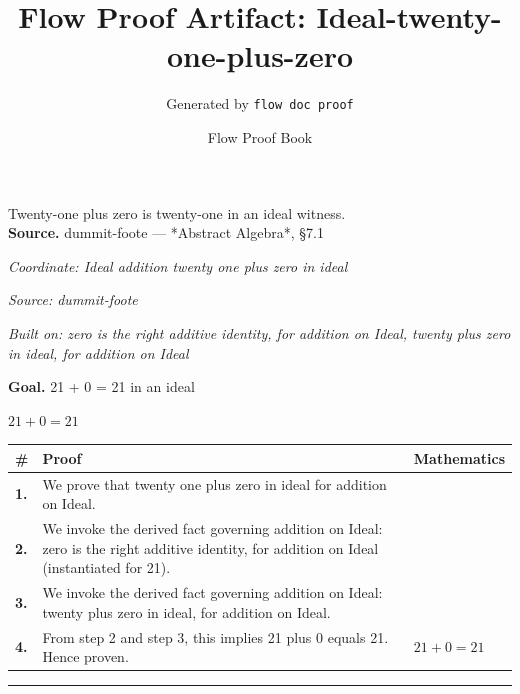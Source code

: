 \documentclass[11pt]{article}
\title{Flow Proof Artifact: Ideal-twenty-one-plus-zero}
\author{Generated by \texttt{flow doc proof}}
\date{Flow Proof Book}
\theoremstyle{definition}
\begin{document}
\maketitle
Twenty-one plus zero is twenty-one in an ideal witness.\\[0.5em]
\textbf{Source.} dummit-foote — *Abstract Algebra*, §7.1\\[0.5em]
\bigskip
{}\par
\smallskip\noindent\textit{Coordinate: Ideal \cdot addition \cdot twenty one plus zero in ideal}\par
\smallskip\noindent\textit{Source: dummit-foote}\par
\smallskip\noindent\textit{Built on: zero is the right additive identity, for addition on Ideal, twenty plus zero in ideal, for addition on Ideal}\par
\medskip
\noindent\textbf{Goal.} 21 + 0 = 21 in an ideal\par
\noindent$\displaystyle 21 + 0 = 21$\par
\medskip
\noindent
\begin{tabular}{@{} >{\raggedright\arraybackslash}p{} >{\raggedright\arraybackslash}p{} >{\raggedleft\arraybackslash}p{} @{}}
\textbf{\#} & \textbf{Proof} & \textbf{Mathematics} \\
\midrule
\textbf{1.} & We prove that twenty one plus zero in ideal for addition on Ideal. & \\[0.45em]
\textbf{2.} & We invoke the derived fact governing addition on Ideal: zero is the right additive identity, for addition on Ideal (instantiated for 21). & \\[0.45em]
\textbf{3.} & We invoke the derived fact governing addition on Ideal: twenty plus zero in ideal, for addition on Ideal. & \\[0.45em]
\textbf{4.} & From step 2 and step 3, this implies 21 plus 0 equals 21. Hence proven. & $\displaystyle 21 + 0 = 21$ \\[0.45em]
\bottomrule
\end{tabular}
\label{thm:Ideal-addition-twenty_one_plus_zero_in_ideal}
\par\medskip\hrule
\end{document}
